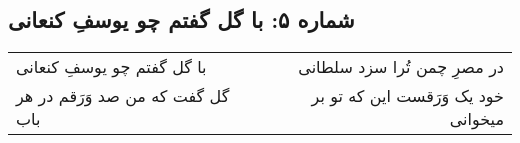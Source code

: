 \begin{center}
\section*{شماره ۵: با گل گفتم چو یوسفِ کنعانی}
\label{sec:005}
\begin{longtable}{l p{0.5cm} r}
با گل گفتم چو یوسفِ کنعانی
&&
در مصرِ چمن تُرا سزد سلطانی
\\
گل گفت که من صد وَرَقم در هر باب
&&
خود یک وَرَقست این که تو بر میخوانی
\\
\end{longtable}
\end{center}
